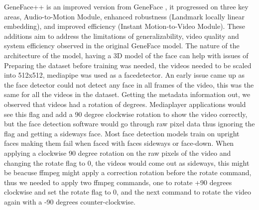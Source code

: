 \documentclass[12pt]{article}
\begin{document}
GeneFace++ is an improved version from GeneFace \cite{geneface} \cite{ye2023geneface++}, it progressed on three key areas, Audio-to-Motion Module, enhanced robustness (Landmark locally linear embedding), and improved efficiency (Instant Motion-to-Video Module). These additions aim to address the limitations of generalizability, video quality and system efficiency observed in the original GeneFace model. The nature of the architecture of the model, having a 3D model of the face can help with issues of Preparing the dataset before training was needed, the videos needed to be scaled into 512x512, mediapipe \cite{GoogleFaceDetector} was used as a facedetector. An early issue came up as the face detector could not detect any face in all frames of the video, this was the same for all the videos in the dataset. Getting the metadata information out, we observed that videos had a rotation of  degrees. Mediaplayer applications would see this flag and add a 90 degree clockwise rotation to show the video correctly, but the face detection software would go through raw pixel data thus ignoring the flag and getting a sideways face. Most face detection models train on upright faces making them fail when faced with faces sideways or face-down. When applying a clockwise 90 degree rotation on the raw pixels of the video and changing the rotate flag to 0, the videos would come out as sideways, this might be beacuse ffmpeg might apply a correction rotation before the rotate command, thus we needed to apply two ffmpeg commands, one to rotate +90 degrees clockwise and set the rotate flag to 0, and the next command to rotate the video again with a -90 degrees counter-clockwise.
\end{document}
